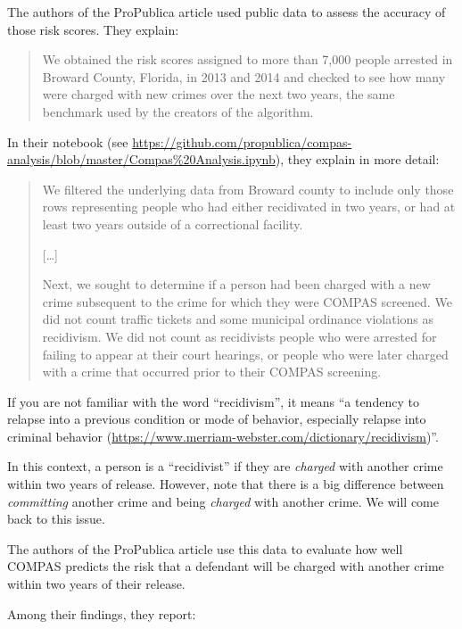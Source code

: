 The authors of the ProPublica article used public data to assess the
accuracy of those risk scores. They explain:

\begin{quote}
We obtained the risk scores assigned to more than 7,000 people arrested
in Broward County, Florida, in 2013 and 2014 and checked to see how many
were charged with new crimes over the next two years, the same benchmark
used by the creators of the algorithm.
\end{quote}

In their notebook (see
\url{https://github.com/propublica/compas-analysis/blob/master/Compas\%20Analysis.ipynb}),
they explain in more detail:

\begin{quote}
We filtered the underlying data from Broward county to include only
those rows representing people who had either recidivated in two years,
or had at least two years outside of a correctional facility.

{[}\ldots{]}

Next, we sought to determine if a person had been charged with a new
crime subsequent to the crime for which they were COMPAS screened. We
did not count traffic tickets and some municipal ordinance violations as
recidivism. We did not count as recidivists people who were arrested for
failing to appear at their court hearings, or people who were later
charged with a crime that occurred prior to their COMPAS screening.
\end{quote}

If you are not familiar with the word ``recidivism'', it means ``a
tendency to relapse into a previous condition or mode of behavior,
especially relapse into criminal behavior
(\url{https://www.merriam-webster.com/dictionary/recidivism})''.

In this context, a person is a ``recidivist'' if they are \emph{charged}
with another crime within two years of release. However, note that there
is a big difference between \emph{committing} another crime and being
\emph{charged} with another crime. We will come back to this issue.

The authors of the ProPublica article use this data to evaluate how well
COMPAS predicts the risk that a defendant will be charged with another
crime within two years of their release.

Among their findings, they report:

